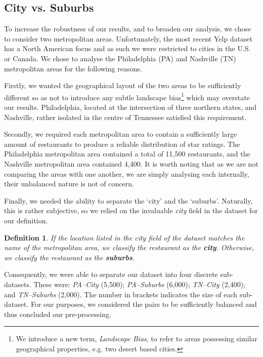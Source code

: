 \documentclass{article}
\newtheorem{definition}{Definition}[section]
\begin{document}
\subsection{City vs. Suburbs}
To increase the robustness of our results, and to broaden our analysis, we chose to consider two metropolitan areas. Unfortunately, the most recent Yelp dataset has a North American focus and as such we were restricted to cities in the U.S. or Canada. We chose to analyse the Philadelphia (PA) and Nashville (TN) metropolitan areas for the following reasons. \par

Firstly, we wanted the geographical layout of the two areas to be sufficiently different so as not to introduce any subtle landscape bias\footnote{We introduce a new term, \textit{Landscape Bias}, to refer to areas possessing similar geographical properties, e.g. two desert based cities.} which may overstate our results. Philadelphia, located at the intersection of three northern states, and Nashville, rather isolated in the centre of Tennessee satisfied this requirement. \par

Secondly, we required each metropolitan area to contain a sufficiently large amount of restaurants to produce a reliable distribution of star ratings. The Philadelphia metropolitan area contained a total of 11,500 restaurants, and the Nashville metropolitan area contained 4,400. It is worth noting that as we are not comparing the areas with one another, we are simply analysing each internally, their unbalanced nature is not of concern. \par

Finally, we needed the ability to separate the `city' and the `suburbs'. Naturally, this is rather subjective, so we relied on the invaluable \textit{city} field in the dataset for our definition.

\begin{definition} 
If the location listed in the city field of the dataset matches the name of the metropolitan area, we classify the restaurant as the \textbf{city}. Otherwise, we classify the restaurant as the \textbf{suburbs}.
\end{definition}

Consequently, we were able to separate our dataset into four discrete sub-datasets. These were: \textit{PA–City} (5,500); \textit{PA–Suburbs} (6,000); \textit{TN–City} (2,400); and \textit{TN–Suburbs} (2,000). The number in brackets indicates the size of each sub-dataset. For our purposes, we considered the pairs to be sufficiently balanced and thus concluded our pre-processing. \par
\end{document}
